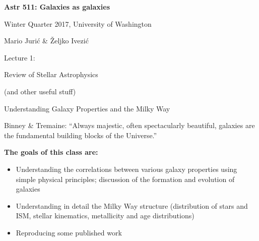 \documentclass[letterpaper,landscape]{slides}
\begin{document}
\newcommand{\palV}[2]{
\begin{slide}
\begin{minipage}{8in}
~\vskip-1in
\rotatebox{0}{\scalebox{0.85}{\texttt{[image: figures/\#1]}}}
\vskip -2.5in~
\end{minipage}

#2

\vfill
\end{slide}
}


\begin{slide}

\phantom{x}
\vskip -2in
\begin{center}
\bfseries
{\large {\color{blue} Astr 511: Galaxies as galaxies}}
\end{center}

{\centerline {{\color{blue} 
Winter Quarter 2017, University of Washington}}}
{\centerline {{\color{blue} 
Mario Juri\'{c} \& \v{Z}eljko Ivezi\'{c} }}}

\vskip 1.6in

{\centerline {\huge {\color{red}      Lecture 1:             }}}
\vskip 0.2in 
{\centerline {\Large {\color{blue} Review of Stellar Astrophysics    }}}
{\centerline {\Large {\color{blue}    (and other useful stuff)       }}}

\vfill
\end{slide}


 

\begin{slide}
\begin{center}
{\large \color{red} Understanding Galaxy Properties and the Milky Way  }
\end{center}


{Binney \& Tremaine: \color{blue} ``Always majestic, often spectacularly 
beautiful, galaxies are the fundamental building blocks of the Universe.''}


{\bf The goals of this class are:}

\begin{itemize}
\item
Understanding the correlations between various galaxy 
properties using simple physical principles; discussion
of the formation and evolution of galaxies
\item 
Understanding in detail the Milky Way structure (distribution
of stars and ISM, stellar kinematics, metallicity and age
distributions)  
\item
Reproducing some published work
\end{itemize}  

\vfill
\end{slide}
\end{document}
